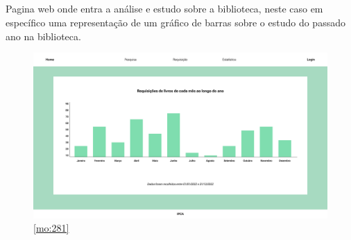 \newpage

\subsection{}

Pagina web onde entra a análise e estudo sobre a biblioteca, neste caso em específico uma representação de um gráfico de barras sobre o estudo do passado ano na biblioteca.

\begin{figure}[H]
	\centering
	\includegraphics[width=1\linewidth]{../Mockups/PNGs/Estatistica barras.png}  %
	\caption{\ref{mo:281}}
	\label{fig:chap281}
\end{figure}
